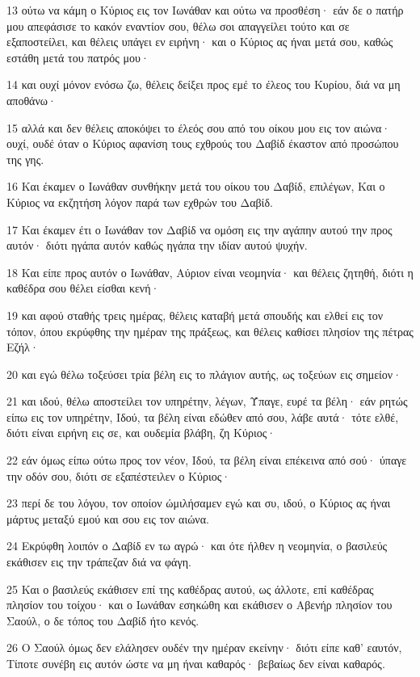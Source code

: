 \par 13 ούτω να κάμη ο Κύριος εις τον Ιωνάθαν και ούτω να προσθέση· εάν δε ο πατήρ μου απεφάσισε το κακόν εναντίον σου, θέλω σοι απαγγείλει τούτο και σε εξαποστείλει, και θέλεις υπάγει εν ειρήνη· και ο Κύριος ας ήναι μετά σου, καθώς εστάθη μετά του πατρός μου·
\par 14 και ουχί μόνον ενόσω ζω, θέλεις δείξει προς εμέ το έλεος του Κυρίου, διά να μη αποθάνω·
\par 15 αλλά και δεν θέλεις αποκόψει το έλεός σου από του οίκου μου εις τον αιώνα· ουχί, ουδέ όταν ο Κύριος αφανίση τους εχθρούς του Δαβίδ έκαστον από προσώπου της γης.
\par 16 Και έκαμεν ο Ιωνάθαν συνθήκην μετά του οίκου του Δαβίδ, επιλέγων, Και ο Κύριος να εκζητήση λόγον παρά των εχθρών του Δαβίδ.
\par 17 Και έκαμεν έτι ο Ιωνάθαν τον Δαβίδ να ομόση εις την αγάπην αυτού την προς αυτόν· διότι ηγάπα αυτόν καθώς ηγάπα την ιδίαν αυτού ψυχήν.
\par 18 Και είπε προς αυτόν ο Ιωνάθαν, Αύριον είναι νεομηνία· και θέλεις ζητηθή, διότι η καθέδρα σου θέλει είσθαι κενή·
\par 19 και αφού σταθής τρεις ημέρας, θέλεις καταβή μετά σπουδής και ελθεί εις τον τόπον, όπου εκρύφθης την ημέραν της πράξεως, και θέλεις καθίσει πλησίον της πέτρας Εζήλ·
\par 20 και εγώ θέλω τοξεύσει τρία βέλη εις το πλάγιον αυτής, ως τοξεύων εις σημείον·
\par 21 και ιδού, θέλω αποστείλει τον υπηρέτην, λέγων, Ύπαγε, ευρέ τα βέλη· εάν ρητώς είπω εις τον υπηρέτην, Ιδού, τα βέλη είναι εδώθεν από σου, λάβε αυτά· τότε ελθέ, διότι είναι ειρήνη εις σε, και ουδεμία βλάβη, ζη Κύριος·
\par 22 εάν όμως είπω ούτω προς τον νέον, Ιδού, τα βέλη είναι επέκεινα από σού· ύπαγε την οδόν σου, διότι σε εξαπέστειλεν ο Κύριος·
\par 23 περί δε του λόγου, τον οποίον ώμιλήσαμεν εγώ και συ, ιδού, ο Κύριος ας ήναι μάρτυς μεταξύ εμού και σου εις τον αιώνα.
\par 24 Εκρύφθη λοιπόν ο Δαβίδ εν τω αγρώ· και ότε ήλθεν η νεομηνία, ο βασιλεύς εκάθισεν εις την τράπεζαν διά να φάγη.
\par 25 Και ο βασιλεύς εκάθισεν επί της καθέδρας αυτού, ως άλλοτε, επί καθέδρας πλησίον του τοίχου· και ο Ιωνάθαν εσηκώθη και εκάθισεν ο Αβενήρ πλησίον του Σαούλ, ο δε τόπος του Δαβίδ ήτο κενός.
\par 26 Ο Σαούλ όμως δεν ελάλησεν ουδέν την ημέραν εκείνην· διότι είπε καθ' εαυτόν, Τίποτε συνέβη εις αυτόν ώστε να μη ήναι καθαρός· βεβαίως δεν είναι καθαρός.
